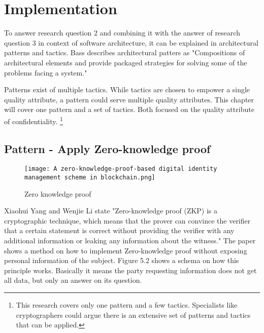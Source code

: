 \chapter{Implementation}\label{s:Implementation}
To answer research question 2 and combining it with the answer of research question 3 in context of software architecture, it can be explained in architectural patterns and tactics. Bass \etal \cite{Bass2015SoftwareAI} describes architectural patters as "Compositions of architectural elements and provide packaged strategies for solving some of the problems facing a system."

Patterns exist of multiple tactics. While tactics are chosen to empower a single quality attribute, a pattern could serve multiple quality attributes. This chapter will cover one pattern and a set of tactics. Both focused on the quality attribute of confidentiality.
\footnote{This research covers only one pattern and a few tactics. Specialists like cryptographers could argue there is an extensive set of patterns and tactics that can be applied.}

\section{Pattern - Apply Zero-knowledge proof}
\graphicspath{ {./images/} }
\begin{figure}[t]
\centering
\label{fig:ZKP}
\texttt{[image: A zero-knowledge-proof-based digital identity management scheme in blockchain.png]}\\
\caption{Zero knowledge proof}
\end{figure}

Xiaohui Yang and Wenjie Li\cite{YANG2020102050} state "Zero-knowledge proof (ZKP) is a cryptographic technique,
which means that the prover can convince the verifier that a certain statement is correct without providing the verifier with any additional information or leaking any information about the witness." The paper shows a method on how to implement Zero-knowledge proof without exposing personal information of the subject. Figure 5.2 shows a schema on how this principle works. Basically it means the party requesting information does not get all data, but only an answer on its question.


